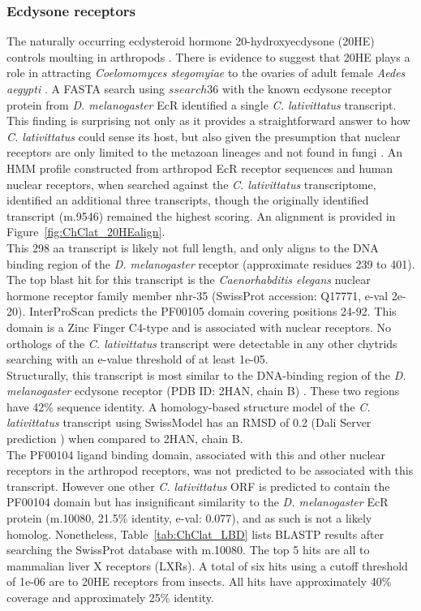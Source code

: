 \subsubsection*{Ecdysone receptors}
The naturally occurring ecdysteroid hormone 20-hydroxyecdysone (20HE) controls moulting in arthropods \cite{Thummel2002}. There is evidence to suggest that 20HE plays a role in attracting \textit{Coelomomyces stegomyiae} to the ovaries of adult female \textit{Aedes aegypti} \cite{Lucarotti1992}. A FASTA search using $ssearch36$ with the known ecdysone receptor protein from \textit{D. melanogaster} EcR \cite{Koelle1991} identified a single \textit{C. lativittatus} transcript. This finding is surprising not only as it provides a straightforward answer to how \textit{C. lativittatus} could sense its host, but also given the presumption that nuclear receptors are only limited to the metazoan lineages and not found in fungi \cite{Escriva1998}. An HMM profile constructed from arthropod EcR receptor sequences and human nuclear receptors, when searched against the \textit{C. lativittatus} transcriptome, identified an additional three transcripts, though the originally identified transcript (m.9546) remained the highest scoring. An alignment is provided in Figure~\ref{fig:ChClat_20HEalign}.\\
\indent This 298 aa transcript is likely not full length, and only aligns to the DNA binding region of the \textit{D. melanogaster} receptor (approximate residues 239 to 401). The top blast hit for this transcript is the \textit{Caenorhabditis elegans} nuclear hormone receptor family member nhr-35 (SwissProt accession: Q17771, e-val 2e-20). InterProScan \cite{Jones2014} predicts the PF00105 domain covering positions 24-92. This domain is a Zinc Finger C4-type and is associated with nuclear receptors. No orthologs of the \textit{C. lativittatus} transcript were detectable in any other chytrids searching with an e-value threshold of at least 1e-05. \\
\indent Structurally, this transcript is most similar to the DNA-binding region of the \textit{D. melanogaster} ecdysone receptor (PDB ID: 2HAN, chain B) \cite{Jakob2007}. These two regions have 42\% sequence identity. A homology-based structure model of the \textit{C. lativittatus} transcript using SwissModel \cite{Arnold2006} has an RMSD of 0.2 (Dali Server prediction \cite{Holm2010}) when compared to 2HAN, chain B. \\
\indent The PF00104 ligand binding domain, associated with this and other nuclear receptors in the arthropod receptors, was not predicted to be associated with this transcript. However one other \textit{C. lativittatus} ORF is predicted to contain the PF00104 domain but has insignificant similarity to the \textit{D. melanogaster} EcR protein (m.10080, 21.5\% identity, e-val: 0.077), and as such is not a likely homolog. Nonetheless, Table~\ref{tab:ChClat_LBD} lists BLASTP results after searching the SwissProt database with m.10080. The top 5 hits are all to mammalian liver X receptors (LXRs). A total of six hits using a cutoff threshold of 1e-06 are to 20HE receptors from insects. All hits have approximately 40\% coverage and approximately 25\% identity. \\
